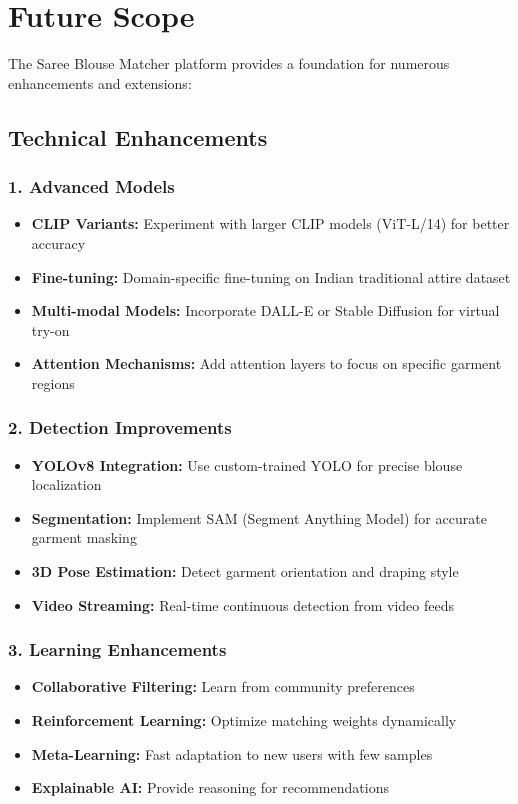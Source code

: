 \documentclass[12pt,a4paper]{report}
\begin{document}
\section{Future Scope}

The Saree Blouse Matcher platform provides a foundation for numerous enhancements and extensions:

\subsection{Technical Enhancements}

\subsubsection{1. Advanced Models}
\begin{itemize}
    \item \textbf{CLIP Variants:} Experiment with larger CLIP models (ViT-L/14) for better accuracy
    \item \textbf{Fine-tuning:} Domain-specific fine-tuning on Indian traditional attire dataset
    \item \textbf{Multi-modal Models:} Incorporate DALL-E or Stable Diffusion for virtual try-on
    \item \textbf{Attention Mechanisms:} Add attention layers to focus on specific garment regions
\end{itemize}

\subsubsection{2. Detection Improvements}
\begin{itemize}
    \item \textbf{YOLOv8 Integration:} Use custom-trained YOLO for precise blouse localization
    \item \textbf{Segmentation:} Implement SAM (Segment Anything Model) for accurate garment masking
    \item \textbf{3D Pose Estimation:} Detect garment orientation and draping style
    \item \textbf{Video Streaming:} Real-time continuous detection from video feeds
\end{itemize}

\subsubsection{3. Learning Enhancements}
\begin{itemize}
    \item \textbf{Collaborative Filtering:} Learn from community preferences
    \item \textbf{Reinforcement Learning:} Optimize matching weights dynamically
    \item \textbf{Meta-Learning:} Fast adaptation to new users with few samples
    \item \textbf{Explainable AI:} Provide reasoning for recommendations
\end{itemize}
\end{document}
